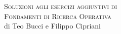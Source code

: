 \documentclass[10pt,a4paper,twoside,openright]{book}
\newcounter{es}
\numberwithin{es}{chapter}
\begin{document}

\frontmatter
\pagestyle{empty} %
\vspace*{\fill}
\begin{center}
	{\large \textsc{Soluzioni agli esercizi aggiuntivi di}}\\
	\vspace*{0.4cm}
	{\Huge \textsc{Fondamenti di Ricerca Operativa}}\\
	\vspace*{1cm}
	{\large {di Teo Bucci e Filippo Cipriani}}\\
\end{center}
\vspace*{\fill}
\newpage


%
%
%
%
%



\newpage


\tableofcontents



\AtEndDocument{\cleardoublepage}


\mainmatter
\pagestyle{fancy} %






\end{document}
